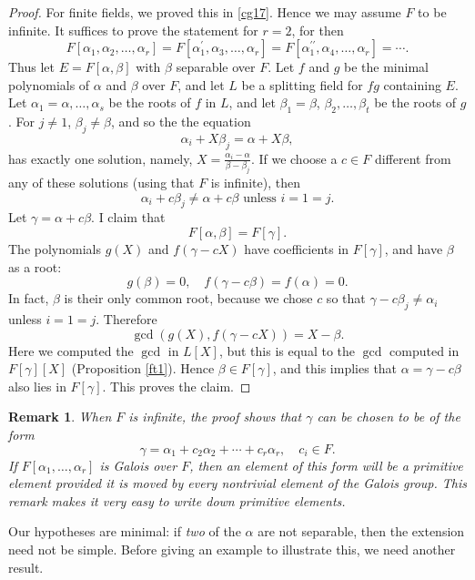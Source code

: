 \documentclass[a4paper,11pt,final,openany]{memoir}
\newtheorem{remark}[X]{Remark}
\theoremstyle{nonumberplain}
\newtheorem{proof}{Proof.}
\begin{document}
\begin{proof}
For finite fields, we proved this in \ref{cg17}. Hence we may assume $F$ to be
infinite. It suffices to prove the statement for $r=2$, for then%
\[
F[\alpha_{1},\alpha_{2},\ldots,\alpha_{r}]=F[\alpha_{1}^{\prime},\alpha
_{3},\ldots,\alpha_{r}]=F[\alpha_{1}^{\prime\prime},\alpha_{4},\ldots
,\alpha_{r}]=\cdots.
\]
Thus let $E=F[\alpha,\beta]$ with $\beta$ separable over $F$. Let $f$ and $g$
be the minimal polynomials of $\alpha$ and $\beta$ over $F$, and let $L$ be a
splitting field for $fg$ containing $E$. Let $\alpha_{1}=\alpha,\ldots
,\alpha_{s}$ be the roots of $f$ in $L$, and let $\beta_{1}=\beta$, $\beta
_{2},\ldots,\beta_{t}$ be the roots of $g$. For $j\neq1$, $\beta_{j}\neq\beta
$, and so the the equation
\[
\alpha_{i}+X\beta_{j}=\alpha+X\beta,
\]
has exactly one solution, namely, $X=\frac{\alpha_{i}-\alpha}{\beta-\beta_{j}%
}$. If we choose a $c\in F$ different from any of these solutions (using that
$F$ is infinite), then
\[
\alpha_{i}+c\beta_{j}\neq\alpha+c\beta\text{\ unless }i=1=j.
\]
Let $\gamma=\alpha+c\beta$. I claim that%
\[
F[\alpha,\beta]=F[\gamma]\text{.}%
\]
The polynomials $g(X)$ and $f(\gamma-cX)$ have coefficients in $F[\gamma]$,
and have $\beta$ as a root:
\[
g(\beta)=0,\quad f(\gamma-c\beta)=f(\alpha)=0.
\]
In fact, $\beta$ is their only common root, because we chose $c$ so that
$\gamma-c\beta_{j}\neq\alpha_{i}$ unless $i=1=j$. Therefore
\[
\gcd(g(X),f(\gamma-cX))=X-\beta\text{.}%
\]
Here we computed the $\gcd$ in $L[X]$, but this is equal to the $\gcd$
computed in $F[\gamma][X]$ (Proposition \ref{ft1}). Hence $\beta\in F[\gamma
]$, and this implies that $\alpha=\gamma-c\beta$ also lies in $F[\gamma]$.
This proves the claim.
\end{proof}

\begin{remark}
\label{ag2}When $F$ is infinite, the proof shows that $\gamma$ can be chosen
to be of the form
\[
\gamma=\alpha_{1}+c_{2}\alpha_{2}+\cdots+c_{r}\alpha_{r},\quad c_{i}\in F.
\]
If $F[\alpha_{1},\ldots,\alpha_{r}]$ is Galois over $F$, then an element of
this form will be a primitive element provided it is moved by every nontrivial
element of the Galois group. This remark makes it very easy to write down
primitive elements.
\end{remark}

Our hypotheses are minimal: if \textit{two\/ }of the $\alpha$ are not
separable, then the extension need not be simple. Before giving an example to
illustrate this, we need another result.
\end{document}
